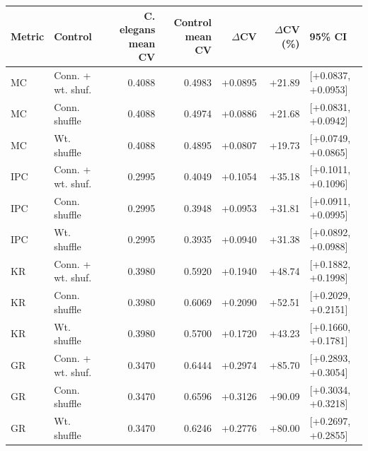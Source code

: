 \begin{tabular}{llrrrrl}
\toprule
Metric & Control & C. elegans mean CV & Control mean CV & $\Delta$CV & $\Delta$CV (\%) & 95\% CI \\
\midrule
MC & Conn. + wt. shuf. & 0.4088 & 0.4983 & +0.0895 & +21.89 & [+0.0837, +0.0953] \\
MC & Conn. shuffle & 0.4088 & 0.4974 & +0.0886 & +21.68 & [+0.0831, +0.0942] \\
MC & Wt. shuffle & 0.4088 & 0.4895 & +0.0807 & +19.73 & [+0.0749, +0.0865] \\
IPC & Conn. + wt. shuf. & 0.2995 & 0.4049 & +0.1054 & +35.18 & [+0.1011, +0.1096] \\
IPC & Conn. shuffle & 0.2995 & 0.3948 & +0.0953 & +31.81 & [+0.0911, +0.0995] \\
IPC & Wt. shuffle & 0.2995 & 0.3935 & +0.0940 & +31.38 & [+0.0892, +0.0988] \\
KR & Conn. + wt. shuf. & 0.3980 & 0.5920 & +0.1940 & +48.74 & [+0.1882, +0.1998] \\
KR & Conn. shuffle & 0.3980 & 0.6069 & +0.2090 & +52.51 & [+0.2029, +0.2151] \\
KR & Wt. shuffle & 0.3980 & 0.5700 & +0.1720 & +43.23 & [+0.1660, +0.1781] \\
GR & Conn. + wt. shuf. & 0.3470 & 0.6444 & +0.2974 & +85.70 & [+0.2893, +0.3054] \\
GR & Conn. shuffle & 0.3470 & 0.6596 & +0.3126 & +90.09 & [+0.3034, +0.3218] \\
GR & Wt. shuffle & 0.3470 & 0.6246 & +0.2776 & +80.00 & [+0.2697, +0.2855] \\
\bottomrule
\end{tabular}
